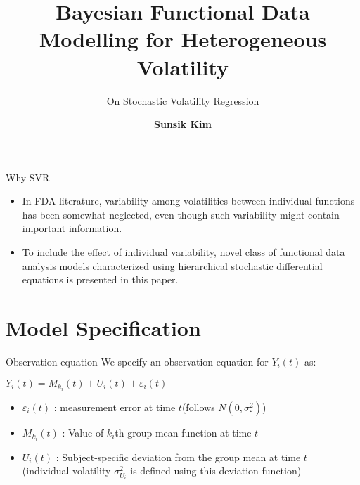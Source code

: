 \documentclass[10pt]{beamer}
\title{Bayesian Functional Data Modelling for Heterogeneous Volatility}
\subtitle{On Stochastic Volatility Regression}
\author{\large{\textbf{Sunsik Kim}}}
\date{}
\def\mean{M_{k_i}(t)}
\def\dev{U_i(t)}
\def\vol{\sigma_{U_i}^2}
\begin{document}
\maketitle


\begin{frame}[t]{Why SVR}
\vspace{4pt}
\begin{itemize}
\item In FDA literature, variability among volatilities between individual functions has been somewhat neglected, even though such variability might contain important information.
\item To include the effect of individual variability, novel class of functional data analysis models characterized using hierarchical stochastic differential equations is presented in this paper.
\end{itemize}
\end{frame}


\section{Model Specification}
\begin{frame}[t]{Observation equation}
\vspace{4pt}
We specify an observation equation for $Y_i(t)$ as:
\begin{center}
$Y_i(t)=\mean+\dev+\varepsilon_i(t)$
\end{center}
\begin{itemize}
\item $\varepsilon_i(t)$ : measurement error at time $t$(follows $N(0,\sigma^{2}_{\varepsilon})$)
\item $\mean$ : Value of $k_i$th group mean function at time $t$
\item $\dev$ : Subject-specific deviation from the group mean at time $t$\\
(individual volatility $\vol$ is defined using this deviation function)
\end{itemize}
\end{frame}
\end{document}
